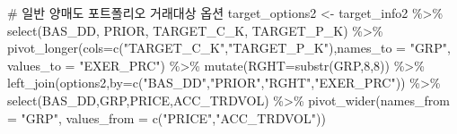 \documentclass[
  a4paper,
  DIV=11,
  numbers=noendperiod]{scrreprt}
\newenvironment{Shaded}{\begin{snugshade}}{\end{snugshade}}
\newcommand{\AttributeTok}[1]{\textcolor[rgb]{0.40,0.45,0.13}{#1}}
\newcommand{\CommentTok}[1]{\textcolor[rgb]{0.37,0.37,0.37}{#1}}
\newcommand{\DecValTok}[1]{\textcolor[rgb]{0.68,0.00,0.00}{#1}}
\newcommand{\FunctionTok}[1]{\textcolor[rgb]{0.28,0.35,0.67}{#1}}
\newcommand{\NormalTok}[1]{\textcolor[rgb]{0.00,0.23,0.31}{#1}}
\newcommand{\OtherTok}[1]{\textcolor[rgb]{0.00,0.23,0.31}{#1}}
\newcommand{\SpecialCharTok}[1]{\textcolor[rgb]{0.37,0.37,0.37}{#1}}
\newcommand{\StringTok}[1]{\textcolor[rgb]{0.13,0.47,0.30}{#1}}
\begin{document}
\begin{Shaded}
\begin{Highlighting}[]
\CommentTok{\# 일반 양매도 포트폴리오 거래대상 옵션}
\NormalTok{target\_options2 }\OtherTok{\textless{}{-}}\NormalTok{ target\_info2 }\SpecialCharTok{\%\textgreater{}\%} 
  \FunctionTok{select}\NormalTok{(BAS\_DD, PRIOR, TARGET\_C\_K, TARGET\_P\_K) }\SpecialCharTok{\%\textgreater{}\%} 
  \FunctionTok{pivot\_longer}\NormalTok{(}\AttributeTok{cols=}\FunctionTok{c}\NormalTok{(}\StringTok{"TARGET\_C\_K"}\NormalTok{,}\StringTok{"TARGET\_P\_K"}\NormalTok{),}\AttributeTok{names\_to =} \StringTok{"GRP"}\NormalTok{, }\AttributeTok{values\_to =} \StringTok{"EXER\_PRC"}\NormalTok{) }\SpecialCharTok{\%\textgreater{}\%} 
  \FunctionTok{mutate}\NormalTok{(}\AttributeTok{RGHT=}\FunctionTok{substr}\NormalTok{(GRP,}\DecValTok{8}\NormalTok{,}\DecValTok{8}\NormalTok{)) }\SpecialCharTok{\%\textgreater{}\%} 
  \FunctionTok{left\_join}\NormalTok{(options2,}\AttributeTok{by=}\FunctionTok{c}\NormalTok{(}\StringTok{"BAS\_DD"}\NormalTok{,}\StringTok{"PRIOR"}\NormalTok{,}\StringTok{"RGHT"}\NormalTok{,}\StringTok{"EXER\_PRC"}\NormalTok{)) }\SpecialCharTok{\%\textgreater{}\%}
  \FunctionTok{select}\NormalTok{(BAS\_DD,GRP,PRICE,ACC\_TRDVOL) }\SpecialCharTok{\%\textgreater{}\%} 
  \FunctionTok{pivot\_wider}\NormalTok{(}\AttributeTok{names\_from =} \StringTok{"GRP"}\NormalTok{, }\AttributeTok{values\_from =} \FunctionTok{c}\NormalTok{(}\StringTok{"PRICE"}\NormalTok{,}\StringTok{"ACC\_TRDVOL"}\NormalTok{))}


\end{Highlighting}
\end{Shaded}
\end{document}
